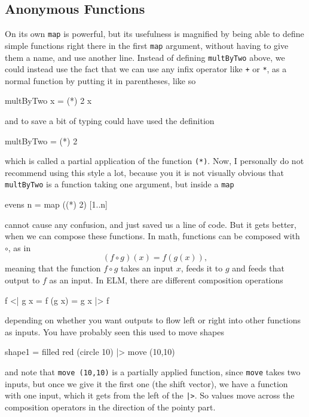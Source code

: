\documentclass[12pt]{amsbook}
\begin{document}
\subsection{Anonymous Functions}
%
On its own \texttt{map} is powerful, 
but its usefulness is magnified by being able to 
define simple functions right there in the first \texttt{map} argument, without having to give them a name, and use another line.  Instead of defining
\texttt{multByTwo} above, we could instead use the 
fact that we can use any infix operator like \texttt{+} or \texttt{*}, as a normal function by putting it in parentheses, like so
\begin{code}
multByTwo x = (*) 2 x
\end{code} 
and to save a bit of typing could have used the definition
\begin{code}
multByTwo = (*) 2
\end{code} 
which is called a partial application of the function \texttt{(*)}.
Now, I personally do not recommend using this style a lot, because you it is not visually obvious that \texttt{multByTwo} is a function taking one argument,
but inside a \texttt{map}
\begin{code}
evens n = map ((*) 2) [1..n]
\end{code} 
cannot cause any confusion, and just saved us a line of code.
But it gets better, when we can compose these functions.
In math, functions can be composed with $\circ$, as in
$$
(f \circ g) (x) = f ( g (x) ),
$$
meaning that the function $f\circ g$ takes an input $x$, feeds it to $g$ and feeds that output to $f$ as an input.
In ELM, there are different composition operations
\begin{code}
f <| g x = f (g x) = g x |> f
\end{code}
depending on whether you want outputs to flow left or right into other functions as inputs.
You have probably seen this used to move shapes 
\begin{code}
shape1 = filled red (circle 10) |> move (10,10)
\end{code}
and note that \texttt{move (10,10)} is a partially applied function, since \texttt{move} takes two inputs, but once we give it the first one (the shift vector), 
we have a function with one input, which it gets from
the left of the \texttt{|>}.
So values move across the composition operators in the 
direction of the pointy part.
\end{document}
